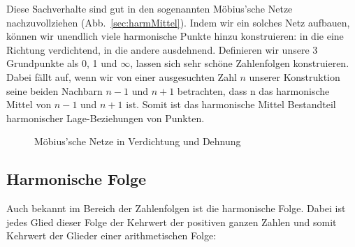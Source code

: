 \documentclass[12pt,a4paper]{article}
\begin{document}
Diese Sachverhalte sind gut in den sogenannten Möbius'sche Netze nachzuvollziehen (Abb.~\ref{sec:harmMittel}). Indem wir ein solches Netz aufbauen, können wir unendlich viele harmonische Punkte hinzu konstruieren: in die eine Richtung verdichtend, in die andere ausdehnend. Definieren wir unsere 3 Grundpunkte als 0, 1 und $\infty$, lassen sich sehr schöne Zahlenfolgen konstruieren. Dabei fällt auf, wenn wir von einer ausgesuchten Zahl $n$ unserer Konstruktion seine beiden Nachbarn $n-1$ und $n+1$ betrachten, dass n das harmonische Mittel von $n-1$ und $n+1$ ist. Somit ist das harmonische Mittel Bestandteil harmonischer Lage-Beziehungen von Punkten.



\begin{figure} [htbp]
 \hfill
{}
\caption{Möbius'sche Netze in Verdichtung und Dehnung}
\end{figure} 

\newpage
\subsection{Harmonische Folge}
\label{subsec:harmFolge}

Auch bekannt im Bereich der Zahlenfolgen ist die harmonische Folge. Dabei ist jedes Glied dieser Folge der Kehrwert der positiven ganzen Zahlen und somit Kehrwert der Glieder einer arithmetischen Folge: 
\end{document}
